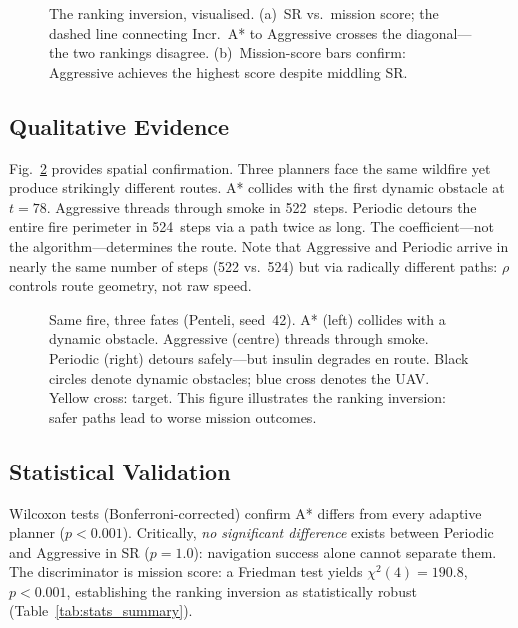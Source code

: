 \documentclass[conference]{IEEEtran}
\begin{document}
\begin{figure}[!t]
  \centering
  \caption{The ranking inversion, visualised. (a)~SR vs.\ mission score;
    the dashed line connecting Incr.~A* to Aggressive crosses the
    diagonal---the two rankings disagree. (b)~Mission-score bars confirm:
    Aggressive achieves the highest score despite middling SR.}
  \label{fig:scatter}
\end{figure}

\subsection{Qualitative Evidence}

Fig.~\ref{fig:comparison5} provides spatial confirmation. Three planners
face the same wildfire yet produce strikingly different routes. A* collides
with the first dynamic obstacle at $t{=}78$. Aggressive threads through smoke in
522~steps. Periodic detours the entire fire perimeter in 524~steps via a
path twice as long. The coefficient---not the algorithm---determines the route. Note that
Aggressive and Periodic arrive in nearly the same number of steps (522
vs.\ 524) but via radically different paths: $\rho$ controls route
geometry, not raw speed.

\begin{figure}[!t]
  \centering
  \caption{Same fire, three fates (Penteli, seed~42). A* (left) collides
    with a dynamic obstacle. Aggressive (centre) threads through smoke.
    Periodic (right) detours safely---but insulin degrades en route. Black
    circles denote dynamic obstacles; blue cross denotes the UAV\@.
    Yellow cross: target. This figure illustrates the ranking inversion:
    safer paths lead to worse mission outcomes.}
  \label{fig:comparison5}
\end{figure}

\subsection{Statistical Validation}

Wilcoxon tests (Bonferroni-corrected) confirm A* differs from every
adaptive planner ($p < 0.001$). Critically, \emph{no significant
difference} exists between Periodic and Aggressive in SR ($p = 1.0$):
navigation success alone cannot separate them. The discriminator is mission
score: a Friedman test yields $\chi^2(4) = 190.8$, $p < 0.001$,
establishing the ranking inversion as statistically robust
(Table~\ref{tab:stats_summary}).
\end{document}
